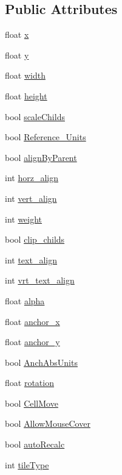 \subsection*{Public Attributes}
\begin{DoxyCompactItemize}
\item 
float \hyperlink{class_g_u_i_shaper_ae2c65722ddfef5f039aead1b972438a9}{x}
\item 
float \hyperlink{class_g_u_i_shaper_aa3e7a3dd639b50ea13cf20e921135dd6}{y}
\item 
float \hyperlink{class_g_u_i_shaper_a014783d6e1614879eb7805784b142ff6}{width}
\item 
float \hyperlink{class_g_u_i_shaper_a191e999c2b744bc66d53c1be30a50dc3}{height}
\item 
bool \hyperlink{class_g_u_i_shaper_a73e39b659b63446e2e224a08e68443f1}{scale\+Childs}
\item 
bool \hyperlink{class_g_u_i_shaper_abbc2097bfafc92195eec0c151c148b9b}{Reference\+\_\+\+Units}
\item 
bool \hyperlink{class_g_u_i_shaper_a580e358d23a681f5cb7b5202baca233e}{align\+By\+Parent}
\item 
int \hyperlink{class_g_u_i_shaper_a9a2bfbaf9ec59501239c4dbf9d5ed74b}{horz\+\_\+align}
\item 
int \hyperlink{class_g_u_i_shaper_ad737cb87adefdda77a552858b77465b1}{vert\+\_\+align}
\item 
int \hyperlink{class_g_u_i_shaper_ab3a41684cd6fbaaf6e11f83b2dd3acf6}{weight}
\item 
bool \hyperlink{class_g_u_i_shaper_a4c0c21a11c137ab56da25f9f3c717ada}{clip\+\_\+childs}
\item 
int \hyperlink{class_g_u_i_shaper_a50f4050dfeeb3801ecb26cb14e4957d6}{text\+\_\+align}
\item 
int \hyperlink{class_g_u_i_shaper_a85ca52a0dbb0e3e7866e676e41176715}{vrt\+\_\+text\+\_\+align}
\item 
float \hyperlink{class_g_u_i_shaper_a27fd95d57c29c638746da0517fc14603}{alpha}
\item 
float \hyperlink{class_g_u_i_shaper_ab289f15431bd5aae24f7401bfe57ac7f}{anchor\+\_\+x}
\item 
float \hyperlink{class_g_u_i_shaper_a840a9182b466cd2aaea5708df98d8c07}{anchor\+\_\+y}
\item 
bool \hyperlink{class_g_u_i_shaper_af8185061a4ea7ead37b42e3561179da4}{Anch\+Abs\+Units}
\item 
float \hyperlink{class_g_u_i_shaper_a4f1113c9cd2ef15fd41500a3f462a01f}{rotation}
\item 
bool \hyperlink{class_g_u_i_shaper_af5315c3768073d007564a40903b94c44}{Cell\+Move}
\item 
bool \hyperlink{class_g_u_i_shaper_ae5c6a8145f4ba27a6a0b2f04d7d38b5b}{Allow\+Mouse\+Cover}
\item 
bool \hyperlink{class_g_u_i_shaper_a54e0093d52f4c09bcd97c85aaae7c156}{auto\+Recalc}
\item 
int \hyperlink{class_g_u_i_shaper_a7e7b2ee7596e285341608338a9789d81}{tile\+Type}
\end{DoxyCompactItemize}


